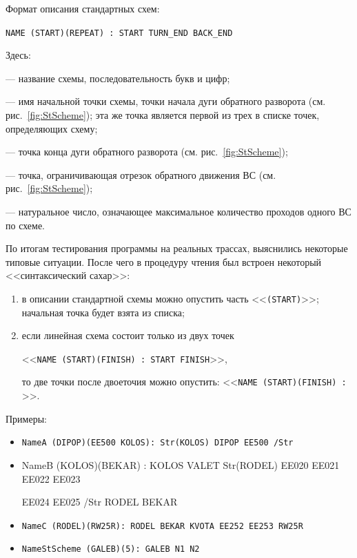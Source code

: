 \documentclass[12pt]{article}
\theoremstyle{plain}
\begin{document}
Формат описания стандартных схем:
\begin{center}
  \verb|NAME (START)(REPEAT) : START TURN_END BACK_END|
\end{center}
Здесь:
\begin{description}[topsep=-0.5\parsep,itemsep=-0.5\parsep]
  \item[\texttt{NAME}] --- название схемы, последовательность букв и цифр; 
  \item[\texttt{START}] --- имя начальной точки схемы, точки начала дуги обратного разворота (см. рис.~\ref{fig:StScheme}); эта же точка является первой из трех в списке точек, определяющих схему;
  \item[\texttt{TURN\_END}] --- точка конца дуги обратного разворота  (см. рис.~\ref{fig:StScheme});
  \item[\texttt{BACK\_END}] --- точка, ограничивающая отрезок обратного движения ВС  (см. рис.~\ref{fig:StScheme});
  \item[\texttt{REPEAT}] --- натуральное число, означающее максимальное количество проходов одного ВС по схеме.
\end{description}

\medskip

По итогам тестирования программы на реальных трассах, выяснились некоторые типовые ситуации. После чего в процедуру чтения был встроен некоторый <<синтаксический сахар>>:
\begin{enumerate}[topsep=-0.5\parsep,itemsep=-0.5\parsep]
  \item в описании стандартной схемы можно опустить часть <<\texttt{(START)}>>; начальная точка будет взята из списка;
  \item если линейная схема состоит только из двух точек 

  \centerline{<<\texttt{NAME (START)(FINISH) : START FINISH}>>,} 

  то две точки после двоеточия можно опустить: <<\texttt{NAME (START)(FINISH) : }>>.
\end{enumerate}

\medskip

Примеры:
\begin{itemize}
  \item \texttt{NameA (DIPOP)(EE500 KOLOS): Str(KOLOS) DIPOP EE500 /Str}
  \item {\ttfamily NameB (KOLOS)(BEKAR) : KOLOS VALET Str(RODEL) EE020 EE021 EE022 EE023

  EE024 EE025 /Str RODEL BEKAR}

  \item \texttt{NameС (RODEL)(RW25R): RODEL BEKAR KVOTA EE252 EE253 RW25R}
  \item \texttt{NameStScheme (GALEB)(5): GALEB N1 N2}
\end{itemize}
\end{document}
